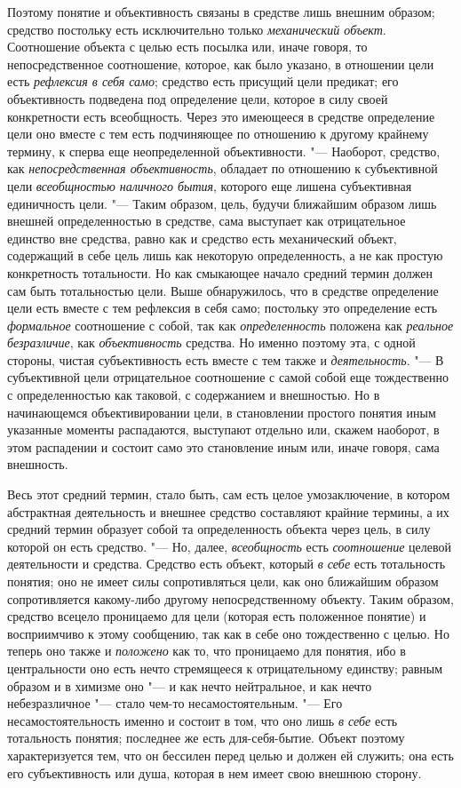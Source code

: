 Поэтому понятие и объективность связаны в средстве лишь
внешним образом; средство постольку есть исключительно только
{\em механический объект}.
Соотношение объекта с целью есть посылка или, иначе говоря,
то непосредственное соотношение, которое, как было указано, в отношении
цели есть {\em рефлексия в себя само};
средство есть присущий цели предикат; его объективность
подведена под определение цели, которое в силу своей конкретности есть
всеобщность. Через это имеющееся в средстве определение цели оно вместе с
тем есть подчиняющее по отношению к другому крайнему термину, к сперва еще
неопределенной объективности. "--- Наоборот, средство, как
{\em непосредственная объективность},
обладает по отношению к субъективной цели
{\em всеобщностью наличного бытия},
которого еще лишена субъективная единичность цели. "---
Таким образом, цель, будучи ближайшим образом лишь внешней
определенностью в средстве, сама выступает как отрицательное единство вне
средства, равно как и средство есть механический объект, содержащий в себе
цель лишь как некоторую определенность, а не как простую конкретность
тотальности. Но как смыкающее начало средний термин должен сам быть
тотальностью цели. Выше обнаружилось, что в средстве определение цели есть
вместе с тем рефлексия в себя само; постольку это определение есть
{\em формальное}
соотношение с собой, так как
{\em определенность}
положена как {\em реальное
безразличие}, как
{\em объективность}
средства. Но именно поэтому эта, с одной стороны, чистая
субъективность есть вместе с тем также и
{\em деятельность}. "--- В
субъективной цели отрицательное соотношение с самой собой еще тождественно
с определенностью как таковой, с содержанием и внешностью. Но в
начинающемся объективировании цели, в становлении простого понятия иным
указанные моменты распадаются, выступают отдельно или, скажем наоборот, в
этом распадении и состоит само это становление иным или, иначе говоря, сама
внешность.

Весь этот средний термин, стало быть, сам есть целое
умозаключение, в котором абстрактная деятельность и внешнее средство
составляют крайние термины, а их средний термин образует собой та
определенность объекта через цель, в силу которой он есть средство. "---
Но, далее,
{\em всеобщность} есть
{\em соотношение} целевой
деятельности и средства. Средство есть объект, который
{\em в себе} есть
тотальность понятия; оно не имеет силы сопротивляться цели, как оно
ближайшим образом сопротивляется какому-либо другому непосредственному
объекту. Таким образом, средство всецело проницаемо для цели (которая есть
положенное понятие) и восприимчиво к этому сообщению, так как в себе оно
тождественно с целью. Но теперь оно также и
{\em положено} как то,
что проницаемо для понятия, ибо в центральности оно есть нечто стремящееся
к отрицательному единству; равным образом и в химизме оно
"--- и как нечто нейтральное, и как нечто небезразличное
"--- стало чем-то несамостоятельным. "--- Его
несамостоятельность именно и состоит в том, что оно лишь
{\em в себе} есть
тотальность понятия; последнее же есть для-себя-бытие. Объект поэтому
характеризуется тем, что он бессилен перед целью и должен ей служить; она
есть его субъективность или душа, которая в нем имеет свою внешнюю сторону.

